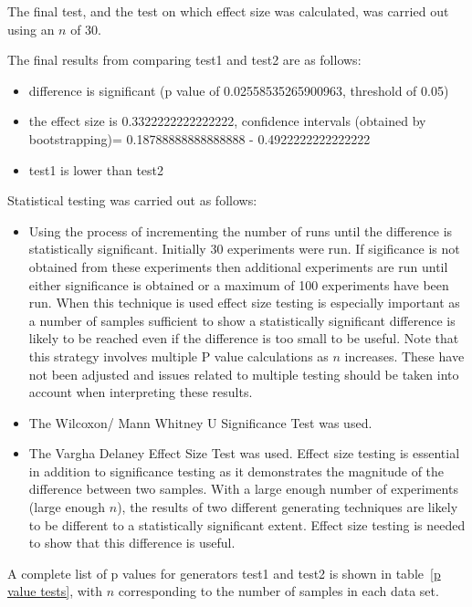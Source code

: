 \documentclass[]{article}
\begin{document}
The final test, and the test on which effect size was calculated, was carried out using an $n$ of 30. 

The final results from comparing test1 and test2 are as follows:
\begin{itemize}
\item{difference is significant (p value of 0.02558535265900963, threshold of 0.05)}
\item{the effect size is 0.3322222222222222, confidence intervals (obtained by bootstrapping)= 0.18788888888888888 - 0.4922222222222222}
\item{test1 is lower than test2}
\end{itemize}

Statistical testing was carried out as follows: 
\begin{itemize}
\item{Using the process of incrementing the number of runs until the difference is statistically significant. Initially 30 experiments were run. If sigificance is not obtained from these experiments then additional experiments are run until either significance is obtained or a maximum of 100 experiments have been run. When this technique is used effect size testing is especially important as a number of samples sufficient to show a statistically significant difference is likely to be reached even if the difference is too small to be useful. Note that this strategy involves multiple P value calculations as $n$ increases. These have not been adjusted and issues related to multiple testing should be taken into account when interpreting these results.
}
\item{The Wilcoxon/ Mann Whitney U Significance Test was used.}
\item{The Vargha Delaney Effect Size Test was used. Effect size testing is essential in addition to significance testing as it demonstrates the magnitude of the difference between two samples. With a large enough number of experiments (large enough $n$), the results of two different generating techniques are likely to be different to a statistically significant extent. Effect size testing is needed to show that this difference is useful.}
\end{itemize}A complete list of p values for generators test1 and test2 is shown in table~\ref{p value tests}, with $n$ corresponding to the number of samples in each data set.
\end{document}
